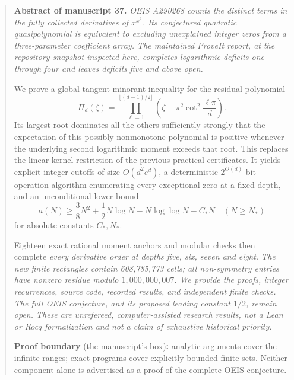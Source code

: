 \documentclass[11pt,a4paper]{article}
\numberwithin{equation}{section}
\theoremstyle{definition}
\theoremstyle{remark}
\theoremstyle{plain}
\begin{document}
\begin{quote}\small
\textbf{Abstract of manuscript 37.}\itshape
OEIS A290268 counts the distinct terms in the fully collected derivatives of
$x^{x^2}$. Its conjectured quadratic quasipolynomial is equivalent to excluding
unexplained integer zeros from a three-parameter coefficient array. The
maintained ProveIt report, at the repository snapshot inspected here, completes
logarithmic deficits one through four and leaves deficits five and above open.

We prove a global tangent-minorant inequality for the residual polynomial
\[
 \Pi_d(\zeta)=\prod_{\ell=1}^{\lfloor(d-1)/2\rfloor}
 \left(\zeta-\pi^2\cot^2\frac{\ell\pi}{d}\right).
\]
Its largest root dominates all the others sufficiently strongly that the
expectation of this possibly nonmonotone polynomial is positive whenever the
underlying second logarithmic moment exceeds that root. This replaces the
linear-kernel restriction of the previous practical certificates. It yields
explicit integer cutoffs of size $O(d^2e^d)$, a deterministic $2^{O(d)}$
bit-operation algorithm enumerating every exceptional zero at a fixed depth,
and an unconditional lower bound
\[
 a(N)\ge \frac38N^2+\frac12N\log N-N\log\log N-C_\ast N
 \quad(N\ge N_\ast)
\]
for absolute constants $C_\ast,N_\ast$.

Eighteen exact rational moment anchors and modular checks then complete
\upshape\emph{every derivative order}\itshape{} at depths five, six, seven and
eight. The new finite rectangles contain 608,785,773 cells; all non-symmetry
entries have nonzero residue modulo $1,000,000,007$. We provide the proofs,
integer recurrences, source code, recorded results, and independent finite
checks. The full OEIS conjecture, and its proposed leading constant $1/2$,
remain open. These are unrefereed, computer-assisted research results, not a
Lean or Rocq formalization and not a claim of exhaustive historical priority.
\upshape\par
\smallskip
\textbf{Proof boundary} (the manuscript's box)\textbf{:} analytic arguments
cover the infinite ranges; exact programs cover explicitly bounded finite
sets. Neither component alone is advertised as a proof of the complete OEIS
conjecture.


\end{quote}
\end{document}
